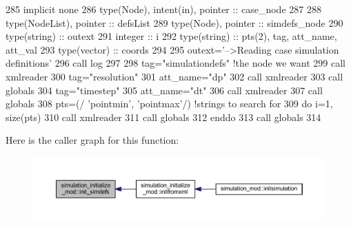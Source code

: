 \begin{DoxyCode}
285     \textcolor{keywordtype}{implicit none}
286     \textcolor{keywordtype}{type}(Node), \textcolor{keywordtype}{intent(in)}, \textcolor{keywordtype}{pointer} :: case\_node
287 
288     \textcolor{keywordtype}{type}(NodeList), \textcolor{keywordtype}{pointer} :: defsList
289     \textcolor{keywordtype}{type}(Node), \textcolor{keywordtype}{pointer} :: simdefs\_node
290     \textcolor{keywordtype}{type}(string) :: outext
291     \textcolor{keywordtype}{integer} :: i
292     \textcolor{keywordtype}{type}(string) :: pts(2), tag, att\_name, att\_val
293     \textcolor{keywordtype}{type}(vector) :: coords
294 
295     outext=\textcolor{stringliteral}{'-->Reading case simulation definitions'}
296     \textcolor{keyword}{call }log%
297 
298     tag=\textcolor{stringliteral}{"simulationdefs"}    \textcolor{comment}{!the node we want}
299     \textcolor{keyword}{call }xmlreader%
300     tag=\textcolor{stringliteral}{"resolution"}
301     att\_name=\textcolor{stringliteral}{"dp"}
302     \textcolor{keyword}{call }xmlreader%
303     \textcolor{keyword}{call }globals%
304     tag=\textcolor{stringliteral}{"timestep"}
305     att\_name=\textcolor{stringliteral}{"dt"}
306     \textcolor{keyword}{call }xmlreader%
307     \textcolor{keyword}{call }globals%
308     pts=(/ \textcolor{stringliteral}{'pointmin'}, \textcolor{stringliteral}{'pointmax'}/) \textcolor{comment}{!strings to search for}
309     \textcolor{keywordflow}{do} i=1, \textcolor{keyword}{size}(pts)
310         \textcolor{keyword}{call }xmlreader%
311         \textcolor{keyword}{call }globals%
312 \textcolor{keywordflow}{    enddo}
313     \textcolor{keyword}{call }globals%
314 
\end{DoxyCode}
Here is the caller graph for this function\+:\nopagebreak
\begin{figure}[H]
\begin{center}
\leavevmode
\includegraphics[width=350pt]{namespacesimulation__initialize__mod_ae4a495136e5f02724a5cc456d5884281_icgraph}
\end{center}
\end{figure}
\mbox{\label{namespacesimulation__initialize__mod_ae89df4e3074d9624a7db2bc015545d8d}} 
